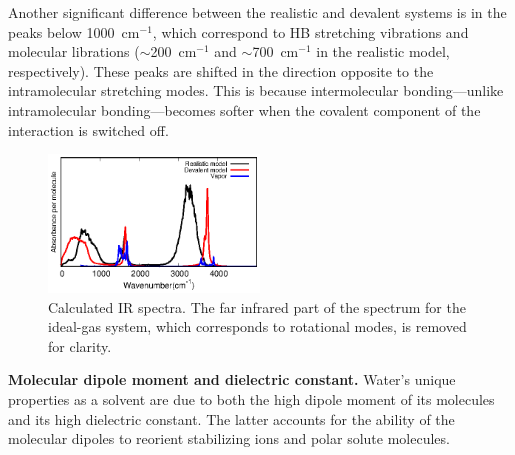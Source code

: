 \documentclass[aps,prl,reprint,amsmath,amssymb]{revtex4-1}
\begin{document}
Another significant difference between the realistic and devalent systems is in the peaks below 1000~cm$^{-1}$, which correspond to HB stretching vibrations and molecular librations ($\sim$200~cm$^{-1}$ and $\sim$700~cm$^{-1}$ in the realistic model, respectively). These peaks are shifted in the direction opposite to the intramolecular stretching modes. This is because intermolecular bonding---unlike intramolecular bonding---becomes softer when the covalent component of the interaction is switched off.%

\begin{figure}
\centering
\includegraphics[width=0.5\textwidth]{new_ir}
\caption{Calculated IR spectra. The far infrared part of the spectrum for the ideal-gas system, which corresponds to rotational modes, is removed for clarity. 
} \label{Fig:IR}
\end{figure}

\textbf{Molecular dipole moment and dielectric constant.} Water's unique properties as a solvent are due to both the high dipole moment of its molecules and its high dielectric constant. 
The latter accounts for the ability of the molecular dipoles to reorient stabilizing ions and polar solute molecules. 
\end{document}
